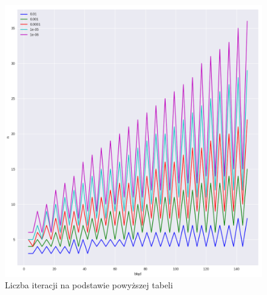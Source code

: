 \documentclass{article}
\begin{document}
\begin{figure}[H]
    \centering
    \includegraphics[width=\textwidth]{img/plot_3.png}
    \caption{Liczba iteracji na podstawie powyższej tabeli}
\end{figure}
\end{document}
